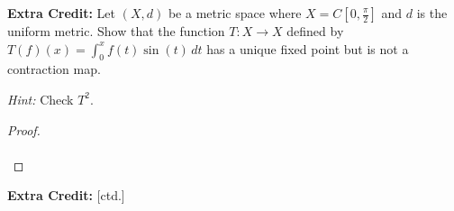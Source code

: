 \textbf{Extra Credit:} Let $(X, d)$ be a metric space where $X = C[0, \frac{\pi}{2}]$ and $d$ is the uniform metric.
Show that the function $T:X \to X$ defined by $T(f)(x) = \int_0^x{f(t)\sin(t) \, dt}$ has a unique fixed point 
but is not a contraction map.

\emph{Hint:} Check $T^2$.

\begin{proof}\renewcommand{\qedsymbol}{}\ \\\\
\end{proof}

\pagebreak
\textbf{Extra Credit:} [ctd.]